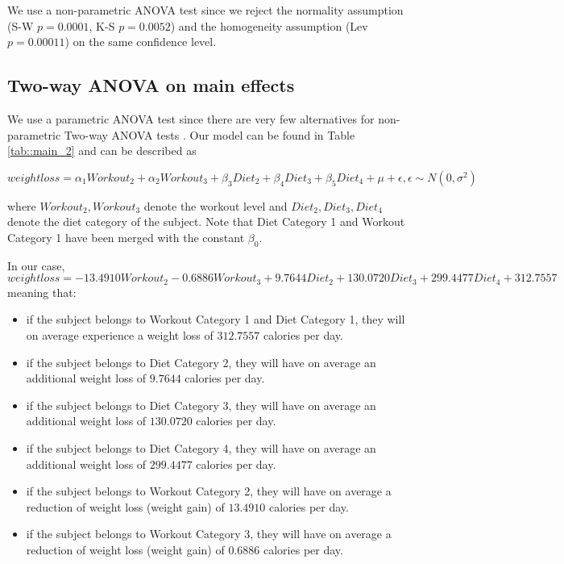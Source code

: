 \documentclass[12pt, a4paper]{article}
\begin{document}
	We use a non-parametric ANOVA test since we reject the normality assumption (S-W $p=0.0001$, K-S $p=0.0052$) and the homogeneity assumption (Lev $p=0.00011$) on the same confidence level. 
	
	
	\subsection{Two-way ANOVA on main effects}
	
	We use a parametric ANOVA test since there are very few alternatives for non-parametric Two-way ANOVA tests \cite{non_param_anova}. Our model can be found in Table \ref{tab::main_2} and can be described as
	
	$$
	weightloss = \alpha_1 Workout_2 + \alpha_2 Workout_3 + \beta_3 Diet_2 + \beta_4 Diet_3 + \beta_5 Diet_4 + \mu + \epsilon, \epsilon \sim N(0, \sigma^2)
	$$
	
	where $Workout_2, Workout_3$ denote the workout level and $Diet_2, Diet_3, Diet_4$ denote the diet category of the subject.  Note that Diet Category 1 and Workout Category 1 have been merged with the constant $\beta_0$.
	
	In our case, 
	$$
	weightloss = - 13.4910 Workout_2 - 0.6886  Workout_3 + 9.7644 Diet_2 + 130.0720 Diet_3 + 299.4477 Diet_4 + 312.7557
	$$ 
	meaning that:
	
	\begin{itemize}
		\item if the subject belongs to Workout Category 1 and Diet Category 1, they will on average experience a weight loss of $312.7557$ calories per day. 
		
		\item if the subject belongs to Diet Category 2, they will have on average an additional weight loss of $9.7644$ calories per day.
		
		\item if the subject belongs to Diet Category 3, they will have on average an additional weight loss of $130.0720$ calories per day.
		
		\item if the subject belongs to Diet Category 4, they will have on average an additional weight loss of $299.4477$ calories per day.
		
		\item if the subject belongs to Workout Category 2, they will have on average a reduction of weight loss (weight gain) of $13.4910$ calories per day.
		
		\item if the subject belongs to Workout Category 3, they will have on average a reduction of weight loss (weight gain) of $0.6886$ calories per day.
	\end{itemize}
	
\end{document}
